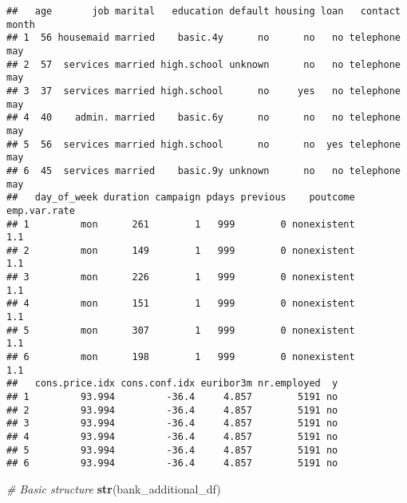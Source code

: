 \documentclass[
]{article}
\newenvironment{Shaded}{\begin{snugshade}}{\end{snugshade}}
\newcommand{\CommentTok}[1]{\textcolor[rgb]{0.56,0.35,0.01}{\textit{#1}}}
\newcommand{\FunctionTok}[1]{\textcolor[rgb]{0.13,0.29,0.53}{\textbf{#1}}}
\newcommand{\NormalTok}[1]{#1}
\begin{document}
\begin{verbatim}
##   age       job marital   education default housing loan   contact month
## 1  56 housemaid married    basic.4y      no      no   no telephone   may
## 2  57  services married high.school unknown      no   no telephone   may
## 3  37  services married high.school      no     yes   no telephone   may
## 4  40    admin. married    basic.6y      no      no   no telephone   may
## 5  56  services married high.school      no      no  yes telephone   may
## 6  45  services married    basic.9y unknown      no   no telephone   may
##   day_of_week duration campaign pdays previous    poutcome emp.var.rate
## 1         mon      261        1   999        0 nonexistent          1.1
## 2         mon      149        1   999        0 nonexistent          1.1
## 3         mon      226        1   999        0 nonexistent          1.1
## 4         mon      151        1   999        0 nonexistent          1.1
## 5         mon      307        1   999        0 nonexistent          1.1
## 6         mon      198        1   999        0 nonexistent          1.1
##   cons.price.idx cons.conf.idx euribor3m nr.employed  y
## 1         93.994         -36.4     4.857        5191 no
## 2         93.994         -36.4     4.857        5191 no
## 3         93.994         -36.4     4.857        5191 no
## 4         93.994         -36.4     4.857        5191 no
## 5         93.994         -36.4     4.857        5191 no
## 6         93.994         -36.4     4.857        5191 no
\end{verbatim}

\begin{Shaded}
\begin{Highlighting}[]
\CommentTok{\# Basic structure}
\FunctionTok{str}\NormalTok{(bank\_additional\_df)}
\end{Highlighting}
\end{Shaded}
\end{document}
